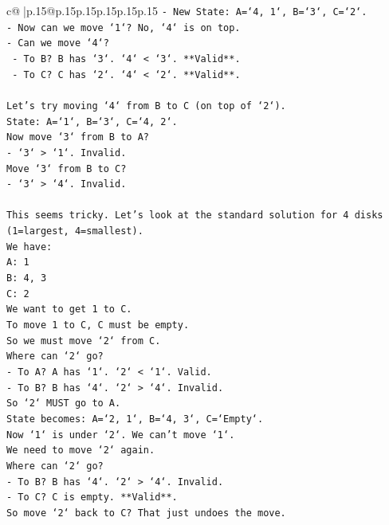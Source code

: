 \documentclass{article}
\begin{document}
{\begin{supertabular}{c@{$\;$}|p{.15\linewidth}@{}p{.15\linewidth}p{.15\linewidth}p{.15\linewidth}p{.15\linewidth}p{.15\linewidth}}
{{{\texttt{{-} New State: A=`4, 1`, B=`3`, C=`2`.} \\
\texttt{{-} Now can we move `1`? No, `4` is on top.} \\
\texttt{{-} Can we move `4`?} \\
\texttt{  {-} To B? B has `3`. `4` < `3`. **Valid**.} \\
\texttt{  {-} To C? C has `2`. `4` < `2`. **Valid**.} \\
\\ 
\texttt{Let's try moving `4` from B to C (on top of `2`).} \\
\texttt{State: A=`1`, B=`3`, C=`4, 2`.} \\
\texttt{Now move `3` from B to A?} \\
\texttt{{-} `3` > `1`. Invalid.} \\
\texttt{Move `3` from B to C?} \\
\texttt{{-} `3` > `4`. Invalid.} \\
\\ 
\texttt{This seems tricky. Let's look at the standard solution for 4 disks (1=largest, 4=smallest).} \\
\texttt{We have:} \\
\texttt{A: 1} \\
\texttt{B: 4, 3} \\
\texttt{C: 2} \\
\texttt{We want to get 1 to C.} \\
\texttt{To move 1 to C, C must be empty.} \\
\texttt{So we must move `2` from C.} \\
\texttt{Where can `2` go?} \\
\texttt{{-} To A? A has `1`. `2` < `1`. Valid.} \\
\texttt{{-} To B? B has `4`. `2` > `4`. Invalid.} \\
\texttt{So `2` MUST go to A.} \\
\texttt{State becomes: A=`2, 1`, B=`4, 3`, C=`Empty`.} \\
\texttt{Now `1` is under `2`. We can't move `1`.} \\
\texttt{We need to move `2` again.} \\
\texttt{Where can `2` go?} \\
\texttt{{-} To B? B has `4`. `2` > `4`. Invalid.} \\
\texttt{{-} To C? C is empty. **Valid**.} \\
\texttt{So move `2` back to C? That just undoes the move.} \\
\\ 
}}}
\end{supertabular}}
\end{document}
